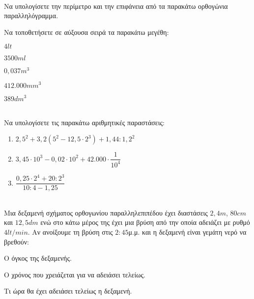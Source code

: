 \documentclass[internet]{diag-xelatex}
\begin{document}
\begin{thema}
\item \mbox{}\\\vspace{-7mm}
\begin{erwthma}
\item Να υπολογίσετε την περίμετρο και την επιφάνεια από τα παρακάτω ορθογώνια παραλληλόγραμμα.
\begin{center}
\qquad{}
\end{center}
\item Να τοποθετήσετε σε αύξουσα σειρά τα παρακάτω μεγέθη:
\begin{multicols}{5}
\begin{rlist}
\item $ 4\si{lt} $
\item $ 3500\si{ml} $
\item $ 0{,}037\si{m}^3 $
\item $ 412.000\si{mm}^3 $
\item $ 389\si{dm}^3 $
\end{rlist}
\end{multicols}
\end{erwthma}
\item \mbox{}\\
Να υπολογίσετε τις παρακάτω αριθμητικές παραστάσεις:
\begin{enumerate}
\item $ 2{,}5^2+3{,}2\left(5^2-12{,}5\cdot2^3 \right)+1{,}44:1{,}2^2  $
\item $ 3{,}45\cdot 10^3-0{,}02\cdot10^2+42.000\cdot\dfrac{1}{10^4} $
\item $ \dfrac{0{,}25\cdot 2^4+20:2^3}{10:4-1{,}25} $
\end{enumerate}
\item \mbox{}\\
Μια δεξαμενή σχήματος ορθογωνίου παραλληλεπιπέδου έχει διαστάσεις $ 2{,}4\si{m} $, $ 80\si{cm} $ και $ 12{,}5\si{dm} $ ενώ στο κάτω μέρος της έχει μια βρύση από την οποία αδειάζει με ρυθμό $ 4\si{lt}/\si{min} $. Αν ανοίξουμε τη βρύση στις $ 2:45 $μ.μ. και η δεξαμενή είναι γεμάτη νερό να βρεθούν:
\begin{rlist}
\item Ο όγκος της δεξαμενής.
\item Ο χρόνος που χρειάζεται για να αδειάσει τελείως.
\item Τι ώρα θα έχει αδειάσει τελείως η δεξαμενή.
\end{rlist}
\end{thema}
\end{document}
